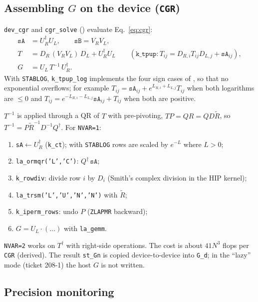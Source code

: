 \subsection{Assembling $G$ on the device (\texttt{CGR})}

\texttt{dev\_cgr} and \texttt{cgr\_solve} () evaluate Eq.~\eqref{eq:cgr}:
\begin{align}
\texttt{sA} &= U_R^\dagger U_L, \qquad \texttt{sB} = V_R V_L,\\
T &= D_R\,(V_RV_L)\,D_L + U_R^\dagger U_L \qquad(\texttt{k\_tpup}: T_{ij}=D_{R,i}T_{ij}D_{L,j}+\texttt{sA}_{ij}),\\
G &= U_L\,T^{-1}\,U_R^\dagger .
\end{align}
With \texttt{STABLOG}, \texttt{k\_tpup\_log} implements the four sign cases of , so that no exponential overflows; for example $T_{ij}=\texttt{sA}_{ij}+e^{L_{R,i}+L_{L,j}}T_{ij}$ when both logarithms are $\le0$ and $T_{ij}=e^{-L_{R,i}-L_{L,j}}\texttt{sA}_{ij}+T_{ij}$ when both are positive.

$T^{-1}$ is applied through a QR of $T$ with pre-pivoting, $TP=QR=QD\tilde R$, so $T^{-1}=P\tilde R^{-1}D^{-1}Q^\dagger$. For \texttt{NVAR=1}:
\begin{enumerate}
\item \texttt{sA}$\leftarrow U_R^\dagger$ (\texttt{k\_ct}); with \texttt{STABLOG} rows are scaled by $e^{-L}$ where $L>0$;
\item \texttt{la\_ormqr('L','C')}: $Q^\dagger\,\texttt{sA}$;
\item \texttt{k\_rowdiv}: divide row $i$ by $D_i$ (Smith's complex division in the HIP kernel);
\item \texttt{la\_trsm('L','U','N','N')} with $\tilde R$;
\item \texttt{k\_iperm\_rows}: undo $P$ (\texttt{ZLAPMR} backward);
\item $G = U_L\cdot(\ldots)$ with \texttt{la\_gemm}.
\end{enumerate}
\texttt{NVAR=2} works on $T^\dagger$ with right-side operations. The cost is about $41N^3$ flops per \texttt{CGR} (derived). The result \texttt{st\_Gn} is copied device-to-device into \texttt{G\_d}; in the ``lazy'' mode (ticket 208-1) the host $G$ is not written.

\subsection{Precision monitoring}

